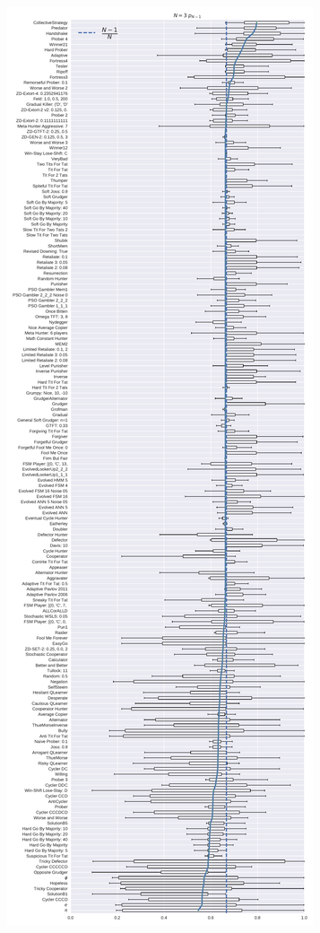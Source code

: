 \documentclass{article}
\begin{document}
\begin{figure}[!hbtp]
    \centering
    \begin{subfigure}[t]{.3\textwidth}
        \centering
        \includegraphics[width=\textwidth]{./img/boxplot_3_resist.pdf}

\end{subfigure}
\end{figure}
\end{document}
